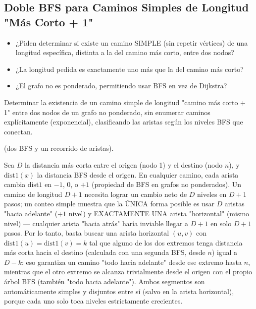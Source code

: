 \subsection{Doble BFS para Caminos Simples de Longitud "Más Corto + 1"}


\begin{itemize}
\item ¿Piden determinar si existe un camino SIMPLE (sin repetir vértices) de una longitud específica, distinta a la del camino más corto, entre dos nodos?
\item ¿La longitud pedida es exactamente uno más que la del camino más corto?
\item ¿El grafo no es ponderado, permitiendo usar BFS en vez de Dijkstra?
\end{itemize}

 Determinar la existencia de un camino simple de longitud "camino más corto + 1" entre dos nodos de un grafo no ponderado, sin enumerar caminos explícitamente (exponencial), clasificando las aristas según los niveles BFS que conectan.

  (dos BFS y un recorrido de aristas).

 Sea $D$ la distancia más corta entre el origen (nodo 1) y el destino (nodo $n$), y $\text{dist1}(x)$ la distancia BFS desde el origen. En cualquier camino, cada arista cambia $\text{dist1}$ en $-1$, $0$, o $+1$ (propiedad de BFS en grafos no ponderados). Un camino de longitud $D+1$ necesita lograr un cambio neto de $D$ niveles en $D+1$ pasos; un conteo simple muestra que la ÚNICA forma posible es usar $D$ aristas "hacia adelante" ($+1$ nivel) y EXACTAMENTE UNA arista "horizontal" (mismo nivel) — cualquier arista "hacia atrás" haría inviable llegar a $D+1$ en solo $D+1$ pasos. Por lo tanto, basta buscar una arista horizontal $(u,v)$ con $\text{dist1}(u)=\text{dist1}(v)=k$ tal que alguno de los dos extremos tenga distancia más corta hacia el destino (calculada con una segunda BFS, desde $n$) igual a $D-k$: eso garantiza un camino "todo hacia adelante" desde ese extremo hasta $n$, mientras que el otro extremo se alcanza trivialmente desde el origen con el propio árbol BFS (también "todo hacia adelante"). Ambos segmentos son automáticamente simples y disjuntos entre sí (salvo en la arista horizontal), porque cada uno solo toca niveles estrictamente crecientes.


